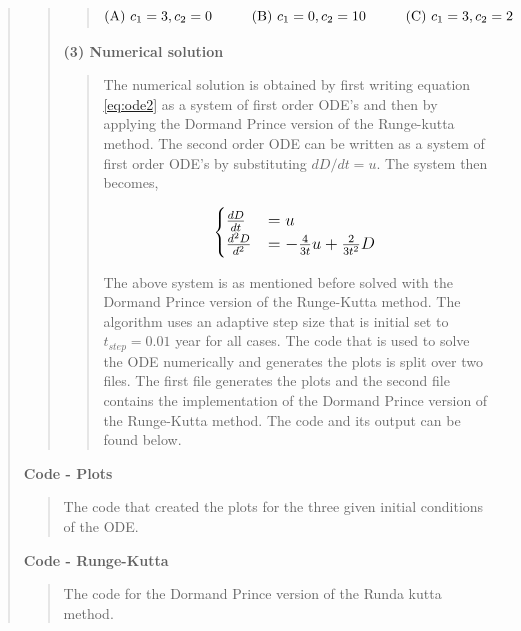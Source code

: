 \begin{quote}
\begin{quote}
\begin{quote}
\begin{equation}
\text{(A) } c_1 = 3, c_2 = 0 \hspace*{1cm} \text{(B) } c_1 =0, c_2 = 10 \hspace*{1cm} \text{(C) } c_1 = 3, c_2 = 2 
\end{equation}

\end{quote}


\textbf{(3) Numerical solution}
\begin{quote}
The numerical solution is obtained by first writing equation \ref{eq:ode2} as a system of first order ODE's and then by applying the Dormand\- Prince version of the Runge-kutta method. The second order ODE  can be written as a system of first order ODE's by substituting $dD/dt = u$. The system then becomes,

\begin{equation}
\large
\begin{cases} 
\frac{dD}{dt} &= u \\ 
\frac{d^2D}{d^2} &= - \frac{4}{3t}u + \frac{2}{3t^2}D 
\end{cases}
\end{equation}

The above system is as mentioned before solved with the Dormand\- Prince version of the Runge-Kutta method. The algorithm uses an adaptive step size that is initial set to $t_{step} = 0.01$ year for all cases. The code that is used to solve the ODE numerically and generates the plots is split over two files. The first file generates the plots and the second file contains the implementation of the Dormand\- Prince version of the Runge-Kutta method. The code and its output can be found below. %
\end{quote}


\newpage
 
\end{quote}

\textbf{Code - Plots}

\begin{quote}
The code that created the plots for the three given initial conditions of the ODE. %
\centering

\end{quote}

\textbf{Code - Runge-Kutta}
\begin{quote}

The code for the Dormand\- Prince version of the Runda kutta method. 


\end{quote}
\end{quote}
